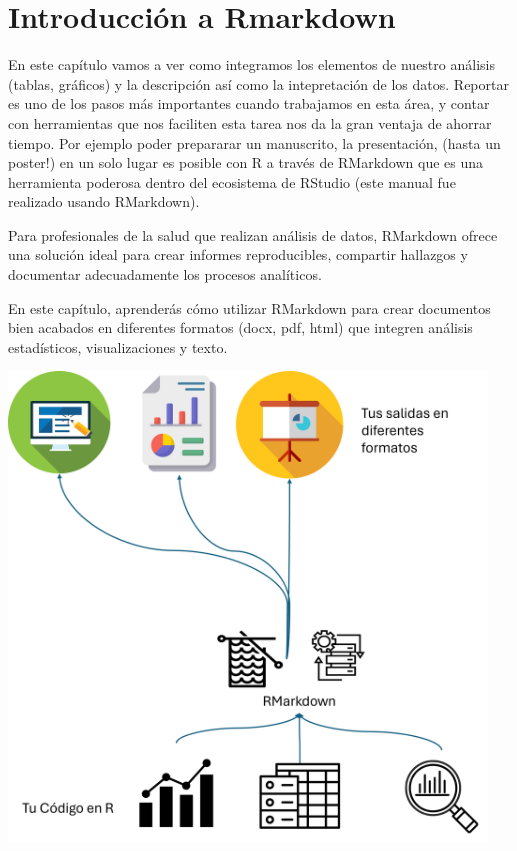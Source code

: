 \documentclass[
  letterpaper,
  DIV=11,
  numbers=noendperiod]{scrreprt}
\begin{document}
\section{Introducción a Rmarkdown}\label{introducciuxf3n-a-rmarkdown}

En este capítulo vamos a ver como integramos los elementos de nuestro
análisis (tablas, gráficos) y la descripción así como la intepretación
de los datos. Reportar es uno de los pasos más importantes cuando
trabajamos en esta área, y contar con herramientas que nos faciliten
esta tarea nos da la gran ventaja de ahorrar tiempo. Por ejemplo poder
prepararar un manuscrito, la presentación, (hasta un poster!) en un solo
lugar es posible con R a través de RMarkdown que es una herramienta
poderosa dentro del ecosistema de RStudio (este manual fue realizado
usando RMarkdown).

Para profesionales de la salud que realizan análisis de datos, RMarkdown
ofrece una solución ideal para crear informes reproducibles, compartir
hallazgos y documentar adecuadamente los procesos analíticos.

En este capítulo, aprenderás cómo utilizar RMarkdown para crear
documentos bien acabados en diferentes formatos (docx, pdf, html) que
integren análisis estadísticos, visualizaciones y texto.

\includegraphics[width=5in,height=\textheight,keepaspectratio]{imagenes/08rmarkdown.png}
\end{document}
